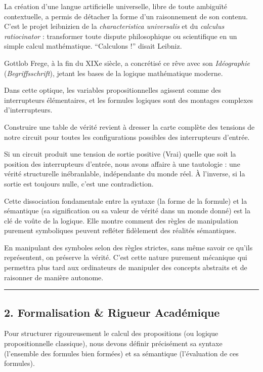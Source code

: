 \documentclass[11pt,a4paper]{article}
\begin{document}
La création d'une langue artificielle universelle, libre de toute
ambiguïté contextuelle, a permis de détacher la forme d'un raisonnement
de son contenu. C'est le projet leibnizien de la \emph{characteristica
universalis} et du \emph{calculus ratiocinator} : transformer toute
dispute philosophique ou scientifique en un simple calcul mathématique.
``Calculons !'' disait Leibniz.

Gottlob Frege, à la fin du XIXe siècle, a concrétisé ce rêve avec son
\emph{Idéographie} (\emph{Begriffsschrift}), jetant les bases de la
logique mathématique moderne.

Dans cette optique, les variables propositionnelles agissent comme des
interrupteurs élémentaires, et les formules logiques sont des montages
complexes d'interrupteurs.

Construire une table de vérité revient à dresser la carte complète des
tensions de notre circuit pour toutes les configurations possibles des
interrupteurs d'entrée.

Si un circuit produit une tension de sortie positive (Vrai) quelle que
soit la position des interrupteurs d'entrée, nous avons affaire à une
tautologie : une vérité structurelle inébranlable, indépendante du monde
réel. À l'inverse, si la sortie est toujours nulle, c'est une
contradiction.

Cette dissociation fondamentale entre la syntaxe (la forme de la
formule) et la sémantique (sa signification ou sa valeur de vérité dans
un monde donné) est la clé de voûte de la logique. Elle montre comment
des règles de manipulation purement symboliques peuvent refléter
fidèlement des réalités sémantiques.

En manipulant des symboles selon des règles strictes, sans même savoir
ce qu'ils représentent, on préserve la vérité. C'est cette nature
purement mécanique qui permettra plus tard aux ordinateurs de manipuler
des concepts abstraits et de raisonner de manière autonome.

\begin{center}\rule{0.5\linewidth}{0.5pt}\end{center}

\hypertarget{formalisation-rigueur-acaduxe9mique}{%
\subsection{2. Formalisation \& Rigueur
Académique}\label{formalisation-rigueur-acaduxe9mique}}

Pour structurer rigoureusement le calcul des propositions (ou logique
propositionnelle classique), nous devons définir précisément sa syntaxe
(l'ensemble des formules bien formées) et sa sémantique (l'évaluation de
ces formules).
\end{document}
